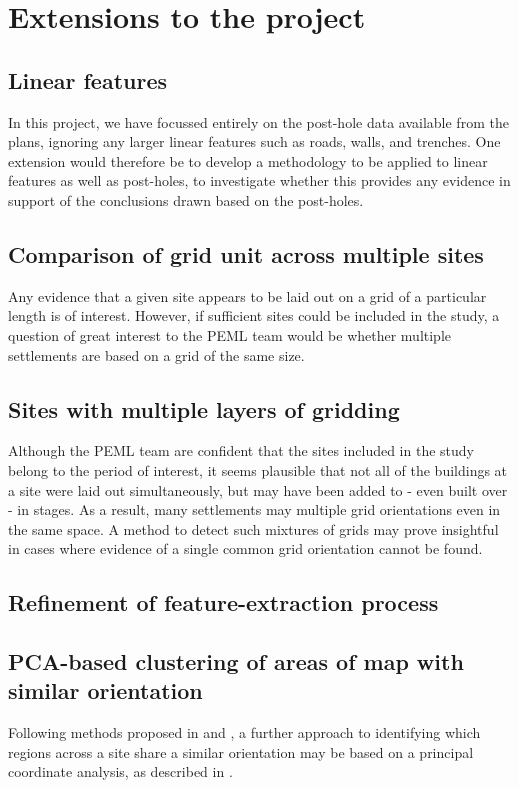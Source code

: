 \documentclass[../../ArchStats.tex]{subfiles}
\begin{document}
\section{Extensions to the project}

\subsection{Linear features}
In this project, we have focussed entirely on the post-hole data available from the plans, ignoring any larger linear features such as roads, walls, and trenches. One extension would therefore be to develop a methodology to be applied to linear features as well as post-holes, to investigate whether this provides any evidence in support of the conclusions drawn based on the post-holes.

\subsection{Comparison of grid unit across multiple sites}
Any evidence that a given site appears to be laid out on a grid of a particular length is of interest. However, if sufficient sites could be included in the study, a question of great interest to the PEML team would be whether multiple settlements are based on a grid of the same size.

\subsection{Sites with multiple layers of gridding}
Although the PEML team are confident that the sites included in the study belong to the period of interest, it seems plausible that not all of the buildings at a site were laid out simultaneously, but may have been added to - even built over - in stages. As a result, many settlements may multiple grid orientations even in the same space. A method to detect such mixtures of grids may prove insightful in cases where evidence of a single common grid orientation cannot be found.

\subsection{Refinement of feature-extraction process}


\subsection{PCA-based clustering of areas of map with similar orientation}
Following methods proposed in \cite{Fisher1993} and \cite{Fisher1985}, a further approach to identifying which regions across a site share a similar orientation may be based on a principal coordinate analysis, as described in \cite{Gower1966}. 
\end{document}
